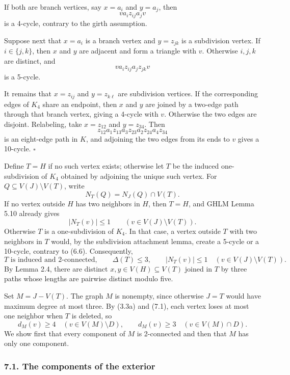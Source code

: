 \documentclass[
  11pt]{article}
\let\papersubsection\subsubsection
\renewcommand{\subsubsection}{\Needspace{7\baselineskip}\papersubsection}
\begin{document}
If both are branch vertices, say \(x=a_i\) and \(y=a_j\), then \[
 v a_i z_{ij} a_j v
\] is a 4-cycle, contrary to the girth assumption.

Suppose next that \(x=a_i\) is a branch vertex and \(y=z_{jk}\) is a
subdivision vertex. If \(i\in\{j,k\}\), then \(x\) and \(y\) are
adjacent and form a triangle with \(v\). Otherwise \(i,j,k\) are
distinct, and \[
 v a_i z_{ij} a_j z_{jk} v
\] is a 5-cycle.

It remains that \(x=z_{ij}\) and \(y=z_{k\ell}\) are subdivision
vertices. If the corresponding edges of \(K_4\) share an endpoint, then
\(x\) and \(y\) are joined by a two-edge path through that branch
vertex, giving a 4-cycle with \(v\). Otherwise the two edges are
disjoint. Relabeling, take \(x=z_{12}\) and \(y=z_{34}\). Then \[
 z_{12}a_1z_{13}a_3z_{23}a_2z_{24}a_4z_{34}
\] is an eight-edge path in \(K\), and adjoining the two edges from its
ends to \(v\) gives a 10-cycle. \(\square\)

Define \(T=H\) if no such vertex exists; otherwise let \(T\) be the
induced one-subdivision of \(K_4\) obtained by adjoining the unique such
vertex. For \(Q\subseteq V(J)\setminus V(T)\), write \[
 N_T(Q)=N_J(Q)\cap V(T).
\] If no vertex outside \(H\) has two neighbors in \(H\), then \(T=H\),
and GHLM Lemma 5.10 already gives \[
 |N_T(v)|\le1\qquad(v\in V(J)\setminus V(T)).
\] Otherwise \(T\) is a one-subdivision of \(K_4\). In that case, a
vertex outside \(T\) with two neighbors in \(T\) would, by the
subdivision attachment lemma, create a 5-cycle or a 10-cycle, contrary
to (6.6). Consequently, \[
 T\text{ is induced and 2-connected},
 \qquad
 \Delta(T)\le3,
 \qquad
 |N_T(v)|\le1\quad(v\in V(J)\setminus V(T)). \tag{7.1}
\] By Lemma 2.4, there are distinct \(x,y\in V(H)\subseteq V(T)\) joined
in \(T\) by three paths whose lengths are pairwise distinct modulo five.

Set \(M=J-V(T)\). The graph \(M\) is nonempty, since otherwise \(J=T\)
would have maximum degree at most three. By (3.3a) and (7.1), each
vertex loses at most one neighbor when \(T\) is deleted, so \[
 d_M(v)\ge4\quad(v\in V(M)\setminus D),
 \qquad
 d_M(v)\ge3\quad(v\in V(M)\cap D). \tag{7.2}
\] We show first that every component of \(M\) is 2-connected and then
that \(M\) has only one component.

\subsubsection{7.1. The components of the
exterior}\label{the-components-of-the-exterior}
\end{document}
